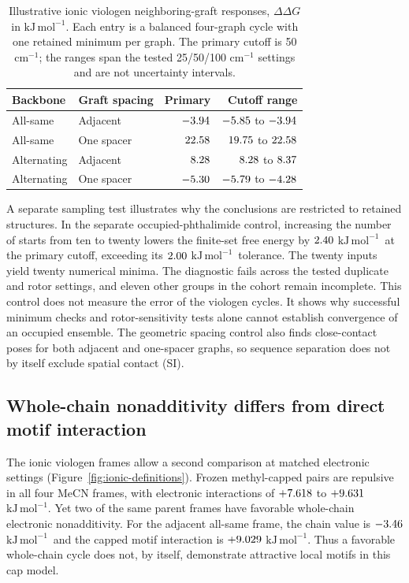 \documentclass[11pt]{article}
\newcommand{\kj}{\ensuremath{\mathrm{kJ\,mol^{-1}}}}
\begin{document}
\begin{table}[htbp]\centering\small
\caption{Illustrative ionic viologen neighboring-graft responses, $\Delta\Delta G$ in \kj. Each entry is a balanced four-graph cycle with one retained minimum per graph. The primary cutoff is 50 cm$^{-1}$; the ranges span the tested 25/50/100 cm$^{-1}$ settings and are not uncertainty intervals.}
\label{tab:ioniccycles}
\begin{tabular}{llrr}\toprule
Backbone & Graft spacing & Primary & Cutoff range\\\midrule
All-same & Adjacent & $-3.94$ & $-5.85$ to $-3.94$\\
All-same & One spacer & $22.58$ & $19.75$ to $22.58$\\
Alternating & Adjacent & $8.28$ & $8.28$ to $8.37$\\
Alternating & One spacer & $-5.30$ & $-5.79$ to $-4.28$\\\bottomrule
\end{tabular}\end{table}

A separate sampling test illustrates why the conclusions are restricted to retained structures. In the separate occupied-phthalimide control, increasing the number of starts from ten to twenty lowers the finite-set free energy by $2.40$ \kj\ at the primary cutoff, exceeding its $2.00$ \kj\ tolerance. The twenty inputs yield twenty numerical minima. The diagnostic fails across the tested duplicate and rotor settings, and eleven other groups in the cohort remain incomplete. This control does not measure the error of the viologen cycles. It shows why successful minimum checks and rotor-sensitivity tests alone cannot establish convergence of an occupied ensemble. The geometric spacing control also finds close-contact poses for both adjacent and one-spacer graphs, so sequence separation does not by itself exclude spatial contact (SI).

\subsection{Whole-chain nonadditivity differs from direct motif interaction}
The ionic viologen frames allow a second comparison at matched electronic settings (Figure~\ref{fig:ionic-definitions}). Frozen methyl-capped pairs are repulsive in all four MeCN frames, with electronic interactions of $+7.618$ to $+9.631$ \kj. Yet two of the same parent frames have favorable whole-chain electronic nonadditivity. For the adjacent all-same frame, the chain value is $-3.46$ \kj\ and the capped motif interaction is $+9.029$ \kj. Thus a favorable whole-chain cycle does not, by itself, demonstrate attractive local motifs in this cap model.
\end{document}
